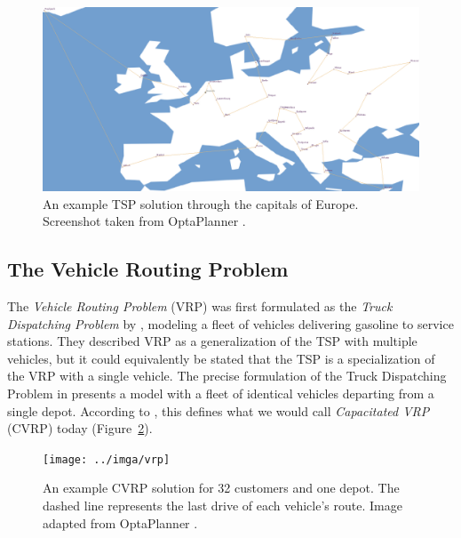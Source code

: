 \begin{figure}[tbp]
\begin{center}
\includegraphics[width=1.0\textwidth]{../img/tsp}
\end{center}
\caption[An example TSP solution through the capitals of Europe.]{An example TSP solution through the capitals of Europe. Screenshot taken from OptaPlanner \citep{DeSmet2017}.}
\label{fig:tsp}
\end{figure}

\subsection{The Vehicle Routing Problem}\label{vrp}

The \textit{Vehicle Routing Problem} (VRP) was first formulated as the \textit{Truck Dispatching Problem} by \citet{Dantzig1959}, modeling a fleet of vehicles delivering gasoline to service stations. They described VRP
as a generalization of the TSP with multiple vehicles, but it could equivalently be stated that the TSP is a specialization of the VRP
with a single vehicle. The precise formulation of the Truck Dispatching Problem in \citet[Section~2]{Dantzig1959} presents a model with a fleet of identical vehicles departing from a single depot. According to \citet[Section~3]{Braekers2016}, this defines what we would call \textit{Capacitated VRP} (CVRP) today (Figure~\ref{fig:vrp}).

\begin{figure}[tb]
\centering
\texttt{[image: ../imga/vrp]}
\caption[An example CVRP solution for 32 customers and one depot.]{An example CVRP solution for 32 customers and one depot. The dashed line represents the last drive of each vehicle's route. Image adapted from OptaPlanner \citep{DeSmet2017}.}
\label{fig:vrp}
\end{figure}


